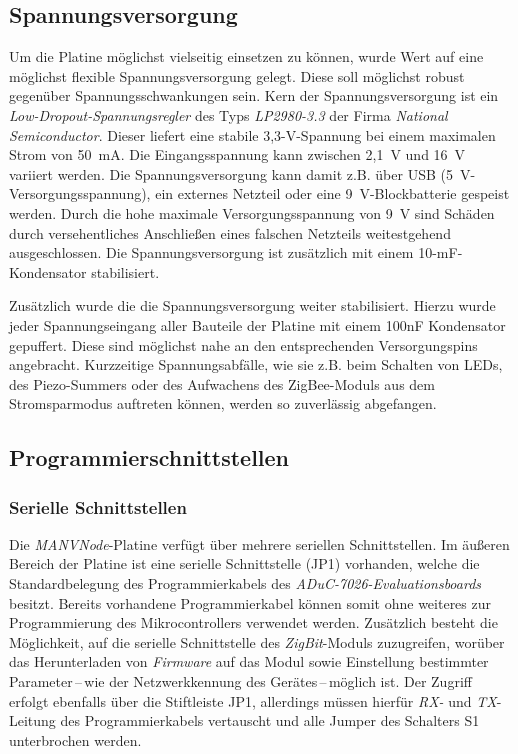 \subsection{Spannungsversorgung}
Um die Platine möglichst vielseitig einsetzen zu können, wurde Wert auf eine möglichst flexible Spannungsversorgung gelegt. Diese
soll möglichst robust gegenüber Spannungsschwankungen sein. Kern der Spannungsversorgung ist ein 
\emph{Low-Dropout-Span\-nungs\-reg\-ler} des Typs \emph{LP2980-3.3} der Firma \emph{National Semiconductor}. Dieser liefert eine stabile
3,3-V-Spannung bei einem maximalen Strom von 50~mA. Die Eingangsspannung kann zwischen 2,1~V und 16~V variiert werden.
Die Spannungsversorgung kann damit z.B. über USB (5~V-Versorgungsspannung), ein externes Netzteil oder eine 
9~V-Blockbatterie gespeist werden. Durch die hohe maximale Versorgungsspannung von 9~V sind Schäden durch versehentliches
Anschließen eines falschen Netzteils weitestgehend ausgeschlossen. Die Spannungsversorgung ist zusätzlich mit einem 
10-mF-Kondensator stabilisiert.

Zusätzlich wurde die die Spannungsversorgung weiter stabilisiert. Hierzu wurde jeder Spannungseingang aller Bauteile der
Platine mit einem 100nF Kondensator gepuffert. Diese sind möglichst nahe an den entsprechenden Versorgungspins angebracht.
Kurzzeitige Spannungsabfälle, wie sie z.B. beim Schalten von LEDs, des Piezo-Summers oder des Aufwachens des ZigBee-Moduls
aus dem Stromsparmodus auftreten können, werden so zuverlässig abgefangen.

\subsection{Programmierschnittstellen}

\subsubsection{Serielle Schnittstellen}
Die \emph{MANVNode}-Platine verfügt über mehrere seriellen Schnittstellen. Im äußeren Bereich der Platine ist eine serielle 
Schnittstelle (JP1) vorhanden, welche die Standardbelegung des Programmierkabels des \emph{ADuC-7026-Evaluationsboards}
besitzt.  Bereits vorhandene Programmierkabel können somit ohne weiteres zur Programmierung des Mikrocontrollers 
verwendet werden.  Zusätzlich besteht die Möglichkeit, auf die serielle Schnittstelle des \emph{ZigBit}-Moduls 
zuzugreifen, worüber das Herunterladen von \emph{Firmware} auf das Modul sowie Einstellung bestimmter 
Parameter\,--\,wie der Netzwerkkennung des Gerätes\,--\,möglich ist.
Der Zugriff erfolgt ebenfalls über die Stiftleiste JP1, allerdings müssen hierfür \emph{RX-} und \emph{TX}-Leitung des 
Programmierkabels vertauscht und alle Jumper des Schalters S1 unterbrochen werden. 

